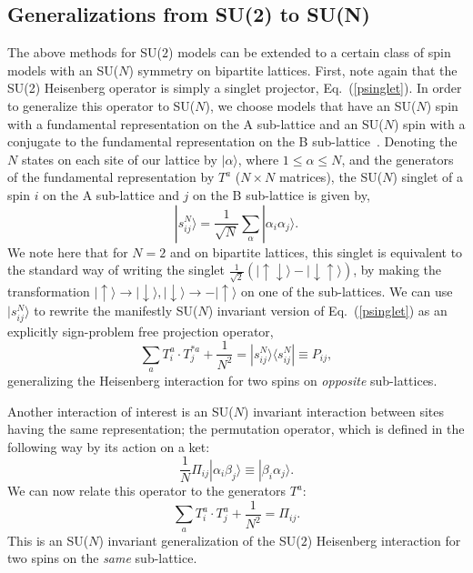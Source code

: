 \documentclass[range]{ar2e}
\begin{document}
\subsection {Generalizations from SU(2) to SU(N)}
\label{ss:su2N}

The above methods for SU($2$) models can be extended to a certain class of spin models with an SU($N$) symmetry on bipartite lattices. First, note again 
that the SU(2) Heisenberg operator is simply a singlet projector, Eq.~(\ref{psinglet}). In order to generalize this operator to SU($N$), we choose models 
that have an SU($N$) spin with a fundamental representation on the A sub-lattice and an SU($N$) spin with a conjugate to the fundamental representation 
on the B sub-lattice~\cite{affleck1985:lgN,Read89}. Denoting the $N$ states on each site of our lattice 
by $|\alpha\rangle$, where $1\leq \alpha \leq N$, and the generators of the fundamental representation by $T^a$ ($N\times N$ matrices),
the SU($N$) singlet of a spin $i$ on the A sub-lattice and $j$ on the B sub-lattice is given by, 
\begin{equation}
|s^N_{ij}\rangle = \frac{1}{\sqrt{N}}\sum_\alpha |\alpha_i\alpha_j\rangle. 
\end{equation}
We note here that for $N=2$ and on bipartite lattices, this singlet is equivalent to the standard way of writing the singlet $\frac{1}{\sqrt{2}}\left (|\uparrow \downarrow\rangle -|\downarrow \uparrow\rangle \right )$, by making the transformation $|\uparrow \rangle\rightarrow |\downarrow\rangle, |\downarrow \rangle\rightarrow -|\uparrow\rangle$ on one of the sub-lattices. We can use  $|s^N_{ij}\rangle$ to rewrite the manifestly SU($N$) invariant version of Eq.~(\ref{psinglet}) as an explicitly sign-problem 
free projection operator,
\begin{equation}
\sum_a T^a_i \cdot
T^{*a}_j + \frac{1}{N^2} = |s^N_{ij}\rangle \langle s^N_{ij}|\equiv P_{ij},
\end{equation}
generalizing the Heisenberg interaction for two spins on {\em opposite} sub-lattices. 

Another interaction of interest is an SU($N$) invariant interaction between sites having the same representation; the permutation operator, 
which is defined in the following way by its action on a ket:
\begin{equation}
\frac{1}{N}\Pi_{ij}|\alpha_i\beta_j\rangle \equiv |\beta_i\alpha_j\rangle. 
\label{pija}
\end{equation}
We can now relate this operator to the generators $T^a$:
\begin{equation}
\sum_a T^a_i \cdot
T^{a}_j +\frac{1}{N^2} =\Pi_{ij}.
\label{pijb}
\end{equation}
This is an SU($N$) invariant generalization of the SU($2$) Heisenberg interaction for two spins on the {\em same} sub-lattice.
\end{document}
